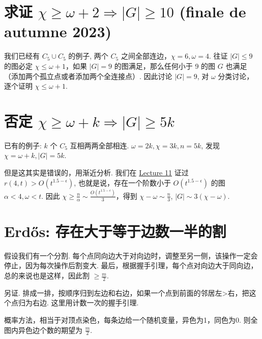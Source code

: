 \section{求证 $\chi\geq\omega+2\Rightarrow|G|\geq 10$ (finale de autumne 2023)}

我们已经有 $C_5\cup C_5$ 的例子, 两个 $C_5$ 之间全部连边，$\chi=6,\omega=4$. 往证 $|G|\leq 9$ 的图必定 $\chi\leq\omega+1$，如果 $|G|=9$ 的图满足，那么任何小于 9 的图 $G$ 也满足（添加两个孤立点或者添加两个全连接点）. 因此讨论 $|G|=9$, 对 $\omega$ 分类讨论，逐个证明 $\chi\leq\omega+1$.

\section{否定 $\chi\geq\omega+k\Rightarrow|G|\geq 5k$}

已有的例子: $k$ 个 $C_5$ 互相两两全部相连. $\omega=2k,\chi=3k,n=5k$, 发现 $\chi=\omega+k,|G|=5k$.

但是这其实是错误的，用渐近分析. 我们在 \href{250427}{Lecture 11} 证过 $r(4,t)>O(t^{1.5-\epsilon})$, 也就是说，存在一个阶数小于 $O(t^{1.5-\epsilon})$ 的图 $\alpha<4,\omega<t$. 因此 $\chi\geq\frac{n}{\alpha}\sim\frac{O(t^{1.5-\epsilon})}{3}$，得到 $\chi-\omega\sim\frac{n}{3}$, $|G|\sim3(\chi-\omega)$.

\section{Erdős: 存在大于等于边数一半的割}

假设我们有一个分割. 每个点同向边大于对向边时，调整至另一侧，该操作一定会停止，因为每次操作后割变大. 最后，根据握手引理，每个点对向边大于同向边，总的来说也是这样，因此割 $\geq\frac{m}{2}$.

另证. 排成一排，按顺序归到左边和右边，如果一个点到前面的邻居左>右，把这个点归为右边. 这里用计数一次的握手引理.

概率方法，相当于对顶点染色，每条边给一个随机变量，异色为1，同色为0. 则全图内异色边个数的期望为 $\frac{m}{2}$.
